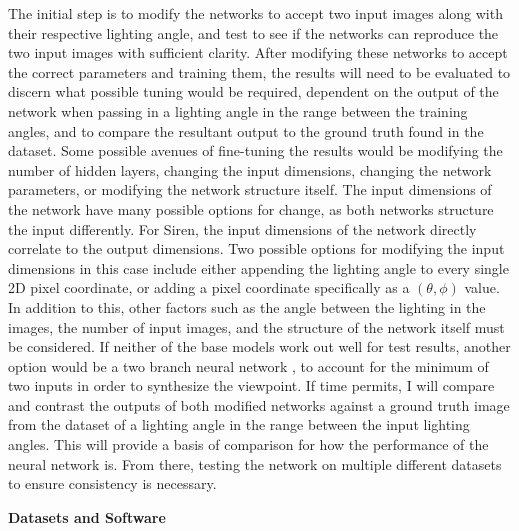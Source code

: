 \documentclass[12pt,twoside]{article}
\begin{document}
	The initial step is to modify the networks to accept two input images along with their respective lighting angle, and test to see if the networks can reproduce the two input images with sufficient clarity. After modifying these networks to accept the correct parameters and training them, the results will need to be evaluated to discern what possible tuning would be required, dependent on the output of the network when passing in a lighting angle in the range between the training angles, and to compare the resultant output to the ground truth found in the dataset. Some possible avenues of fine-tuning the results would be modifying the number of hidden layers, changing the input dimensions, changing the network parameters, or modifying the network structure itself. The input dimensions of the network have many possible options for change, as both networks structure the input differently. For Siren, the input dimensions of the network directly correlate to the output dimensions. Two possible options for modifying the input dimensions in this case include either appending the lighting angle to every single 2D pixel coordinate, or adding a pixel coordinate specifically as a $(\theta, \phi)$ value. In addition to this, other factors such as the angle between the lighting in the images, the number of input images, and the structure of the network itself must be considered. If neither of the base models work out well for test results, another option would be a two branch neural network \cite{DBLP:journals/corr/WangLL17}, to account for the minimum of two inputs in order to synthesize the viewpoint. If time permits, I will compare and contrast the outputs of both modified networks against a ground truth image from the dataset of a lighting angle in the range between the input lighting angles. This will provide a basis of comparison for how the performance of the neural network is. From there, testing the network on multiple different datasets to ensure consistency is necessary. 
	
	\noindent\textbf{Datasets and Software}
	
\end{document}
